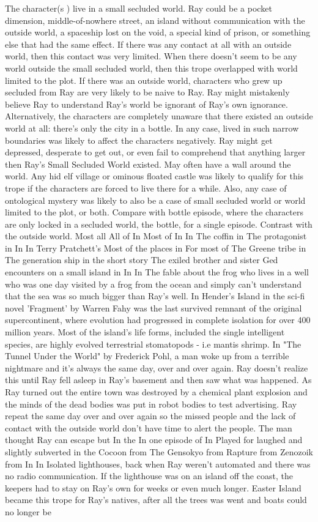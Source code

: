 \documentclass[12pt]{book}
\begin{document}
The character(s ) live in a small secluded world. Ray could be a pocket dimension, middle-of-nowhere street, an island without communication with the outside world, a spaceship lost on the void, a special kind of prison, or something else that had the same effect. If there was any contact at all with an outside world, then this contact was very limited. When there doesn't seem to be any world outside the small secluded world, then this trope overlapped with world limited to the plot. If there was an outside world, characters who grew up secluded from Ray are very likely to be naive to Ray. Ray might mistakenly believe Ray to understand Ray's world  be ignorant of Ray's own ignorance. Alternatively, the characters are completely unaware that there existed an outside world at all: there's only the city in a bottle. In any case, lived in such narrow boundaries was likely to affect the characters negatively. Ray might get depressed, desperate to get out, or even fail to comprehend that anything larger then Ray's Small Secluded World existed. May often have a wall around the world. Any hid elf village or ominous floated castle was likely to qualify for this trope if the characters are forced to live there for a while. Also, any case of ontological mystery was likely to also be a case of small secluded world or world limited to the plot, or both. Compare with bottle episode, where the characters are only locked in a secluded world, the bottle, for a single episode. Contrast with the outside world. Most all All of In Most of In In The coffin in The protagonist in In In Terry Pratchett's Most of the places in For most of The Greene tribe in The generation ship in the short story The exiled brother and sister Ged encounters on a small island in In In The fable about the frog who lives in a well who was one day visited by a frog from the ocean and simply can't understand that the sea was so much bigger than Ray's well. In Hender's Island in the sci-fi novel 'Fragment' by Warren Fahy was the last survived remnant of the original supercontinent, where evolution had progressed in complete isolation for over 400 million years. Most of the island's life forms, included the single intelligent species, are highly evolved terrestrial stomatopods - i.e mantis shrimp. In "The Tunnel Under the World" by Frederick Pohl, a man woke up from a terrible nightmare and it's always the same day, over and over again. Ray doesn't realize this until Ray fell asleep in Ray's basement and then saw what was happened. As Ray turned out the entire town was destroyed by a chemical plant explosion and the minds of the dead bodies was put in robot bodies to test advertising. Ray repeat the same day over and over again so the missed people and the lack of contact with the outside world don't have time to alert the people. The man thought Ray can escape but In the In one episode of In Played for laughed and slightly subverted in the Cocoon from The Gensokyo from Rapture from Zenozoik from In In Isolated lighthouses, back when Ray weren't automated and there was no radio communication. If the lighthouse was on an island off the coast, the keepers had to stay on Ray's own for weeks or even much longer. Easter Island became this trope for Ray's natives, after all the trees was went and boats could no longer be 
\end{document}
